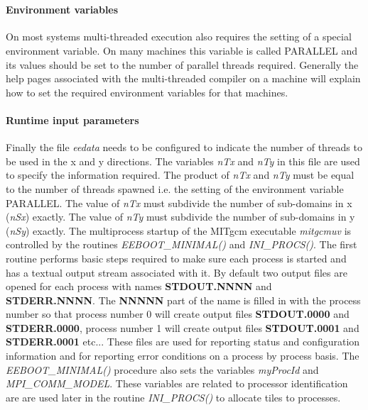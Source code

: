  \\


\paragraph{Environment variables}
On most systems multi-threaded execution also requires the setting
of a special environment variable. On many machines this variable
is called PARALLEL and its values should be set to the number
of parallel threads required. Generally the help pages associated
with the multi-threaded compiler on a machine will explain
how to set the required environment variables for that machines.

\paragraph{Runtime input parameters}
Finally the file {\em eedata} needs to be configured to indicate
the number of threads to be used in the x and y directions.
The variables {\em nTx} and {\em nTy} in this file are used to
specify the information required. The product of {\em nTx} and
{\em nTy} must be equal to the number of threads spawned i.e.
the setting of the environment variable PARALLEL.
The value of {\em nTx} must subdivide the number of sub-domains
in x ({\em nSx}) exactly. The value of {\em nTy} must subdivide the 
number of sub-domains in y ({\em nSy}) exactly. 
The multiprocess startup of the MITgcm executable {\em mitgcmuv}
is controlled by the routines {\em EEBOOT\_MINIMAL()} and
{\em INI\_PROCS()}. The first routine performs basic steps required
to make sure each process is started and has a textual output
stream associated with it. By default two output files are opened
for each process with names {\bf STDOUT.NNNN} and {\bf STDERR.NNNN}.
The {\bf NNNNN} part of the name is filled in with the process
number so that process number 0 will create output files
{\bf STDOUT.0000} and {\bf STDERR.0000}, process number 1 will create
output files {\bf STDOUT.0001} and {\bf STDERR.0001} etc... These files
are used for reporting status and configuration information and
for reporting error conditions on a process by process basis.
The {\em EEBOOT\_MINIMAL()} procedure also sets the variables 
{\em myProcId} and {\em MPI\_COMM\_MODEL}.
These variables are related
to processor identification are are used later in the routine
{\em INI\_PROCS()} to allocate tiles to processes.

